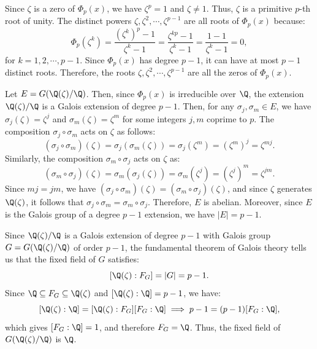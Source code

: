 \begin{solution}[(i)]
  Since $\zeta$ is a zero of $\Phi_p(x)$, we have $\zeta^p = 1$ and $\zeta \neq 1$. Thus, $\zeta$ is a primitive $p$-th root of unity. The distinct powers $\zeta, \zeta^2, \cdots, \zeta^{p-1}$ are all roots of $\Phi_p(x)$ because:
  \[%
    \Phi_p(\zeta^k) = \frac{(\zeta^k)^p - 1}{\zeta^k - 1} = \frac{\zeta^{kp} - 1}{\zeta^k - 1} = \frac{1 - 1}{\zeta^k - 1} = 0
  ,\]%
  for $k = 1, 2, \cdots, p-1$. Since $\Phi_p(x)$ has degree $p-1$, it can have at most $p-1$ distinct roots. Therefore, the roots $\zeta, \zeta^2, \cdots, \zeta^{p-1}$ are all the zeros of $\Phi_p(x)$.
\end{solution}

\begin{solution}[(ii)]
  Let $E = G(\Q(\zeta)/\Q)$. Then, since $\Phi_p(x)$ is irreducible over $\Q$, the extension $\Q(\zeta)/\Q$ is a Galois extension of degree $p - 1$. Then, for any $\sigma_j, \sigma_m \in E$, we have $\sigma_j(\zeta) = \zeta^j$ and $\sigma_m(\zeta) = \zeta^m$ for some integers $j, m$ coprime to $p$. The composition $\sigma_j \circ \sigma_m$ acts on $\zeta$ as follows:
  \[%
    (\sigma_j \circ \sigma_m)(\zeta) = \sigma_j(\sigma_m(\zeta)) = \sigma_j(\zeta^m) = (\zeta^m)^j = \zeta^{mj}
  .\]%
  Similarly, the composition $\sigma_m \circ \sigma_j$ acts on $\zeta$ as:
  \[%
    (\sigma_m \circ \sigma_j)(\zeta) = \sigma_m(\sigma_j(\zeta)) = \sigma_m(\zeta^j) = (\zeta^j)^m = \zeta^{jm}
  .\]%
  Since $mj = jm$, we have $(\sigma_j \circ \sigma_m)(\zeta) = (\sigma_m \circ \sigma_j)(\zeta)$, and since $\zeta$ generates $\Q(\zeta)$, it follows that $\sigma_j \circ \sigma_m = \sigma_m \circ \sigma_j$. Therefore, $E$ is abelian. Moreover, since $E$ is the Galois group of a degree $p - 1$ extension, we have $|E| = p - 1$.
\end{solution}

\begin{solution}[(iii)]
  Since $\Q(\zeta)/\Q$ is a Galois extension of degree $p - 1$ with Galois group $G = G(\Q(\zeta)/\Q)$ of order $p - 1$, the fundamental theorem of Galois theory tells us that the fixed field of $G$ satisfies:
  \[%
    [\Q(\zeta) : F_G] = |G| = p - 1
  .\]%
  Since $\Q \subseteq F_G \subseteq \Q(\zeta)$ and $[\Q(\zeta) : \Q] = p - 1$, we have:
  \[%
    [\Q(\zeta) : \Q] = [\Q(\zeta) : F_G][F_G : \Q] \implies p - 1 = (p - 1)[F_G : \Q]
  ,\]%
  which gives $[F_G : \Q] = 1$, and therefore $F_G = \Q$. Thus, the fixed field of $G(\Q(\zeta)/\Q)$ is $\Q$.
\end{solution}

